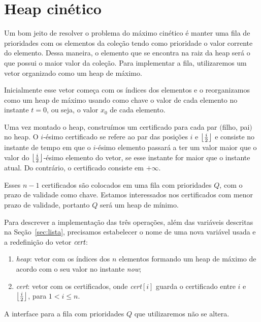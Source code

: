

\section{Heap cinético}\label{sec:heap-cinetico}
Um bom jeito de resolver o problema do máximo cinético é manter uma fila de
prioridades com os elementos da coleção tendo como prioridade o valor corrente
do elemento.
Dessa maneira, o elemento que se encontra na raiz da heap será o que possui o maior valor da
coleção.
Para implementar a fila, utilizaremos um vetor organizado como um heap de máximo.

Inicialmente esse vetor começa com os índices dos elementos e o reorganizamos como um
heap de máximo usando como chave o valor de cada elemento no instante $t = 0$, ou seja, o
valor $x_0$ de cada elemento.

Uma vez montado o heap, construímos um certificado para cada par $($filho,
pai$)$ no heap.
O $i$-ésimo certificado se refere ao par das posições $i$ e $\left\lfloor \frac{i}{2} \right\rfloor$ e consiste no
instante de tempo em que o $i$-ésimo elemento passará a ter um valor maior que o valor do
$\left\lfloor \frac{i}{2} \right\rfloor$-ésimo elemento do vetor, se esse instante for maior que o instante atual.
Do contrário, o certificado consiste em $+\infty$.

Esses $n - 1$ certificados são colocados em uma fila com prioridades $Q$, com o
prazo de validade como chave.
Estamos interessados nos certificados com menor prazo de validade, portanto $Q$ será um heap de
mínimo.

Para descrever a implementação das três operações, além das variáveis descritas na
Seção~\ref{sec:lista}, precisamos estabelecer o nome de uma nova variável usada e a redefinição do
vetor $\textit{cert}$:
\begin{enumerate}
    \item \textit{heap}: vetor com os índices dos $n$ elementos
    formando um heap de máximo de acordo com o seu valor no instante
    \textit{now};
    \item \textit{cert}: vetor com os certificados, onde
    \textit{cert}$[i]$ guarda o certificado entre $i$ e
    $\left\lfloor \frac{i}{2} \right\rfloor$, para $1 < i \leq n$.
\end{enumerate}

A interface para a fila com prioridades $Q$ que utilizaremos não se altera.

